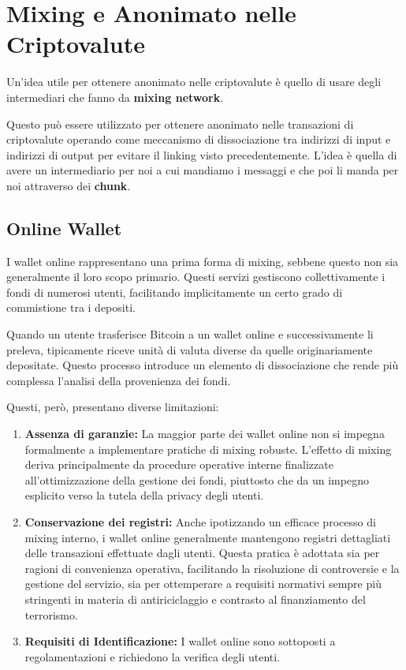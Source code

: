 \section{Mixing e Anonimato nelle Criptovalute}
Un'idea utile per ottenere anonimato nelle criptovalute è quello di usare degli intermediari che fanno da \textbf{mixing network}.

Questo può essere utilizzato per ottenere anonimato nelle transazioni di criptovalute operando come meccanismo di dissociazione tra indirizzi di input e indirizzi di output per evitare il linking visto precedentemente. L'idea è quella di avere un intermediario per noi a cui mandiamo i messaggi e che poi li manda per noi attraverso dei \textbf{chunk}.

\subsection{Online Wallet}
I wallet online rappresentano una prima forma di mixing, sebbene questo non sia generalmente il loro scopo primario. Questi servizi gestiscono collettivamente i fondi di numerosi utenti, facilitando implicitamente un certo grado di commistione tra i depositi. 

Quando un utente trasferisce Bitcoin a un wallet online e successivamente li preleva, tipicamente riceve unità di valuta diverse da quelle originariamente depositate. Questo processo introduce un elemento di dissociazione che rende più complessa l’analisi della provenienza dei fondi.

Questi, però, presentano diverse limitazioni:
\begin{enumerate}
    \item \textbf{Assenza di garanzie:}  La maggior parte dei wallet online non si impegna formalmente a implementare pratiche di mixing robuste. L’effetto di mixing deriva principalmente da procedure operative interne finalizzate all’ottimizzazione della gestione dei fondi, piuttosto che da un impegno esplicito verso la tutela della privacy degli utenti. 
    \item \textbf{Conservazione dei registri:} Anche ipotizzando un efficace processo di mixing interno, i wallet online generalmente mantengono registri dettagliati delle transazioni effettuate dagli utenti. Questa pratica è adottata sia per ragioni di convenienza operativa, facilitando la risoluzione di controversie e la gestione del servizio, sia per ottemperare a requisiti normativi sempre più stringenti in materia di antiriciclaggio e contrasto al finanziamento del terrorismo.
    \item \textbf{Requisiti di Identificazione:} I wallet online sono sottoposti a regolamentazioni e richiedono la verifica degli utenti.
\end{enumerate}

